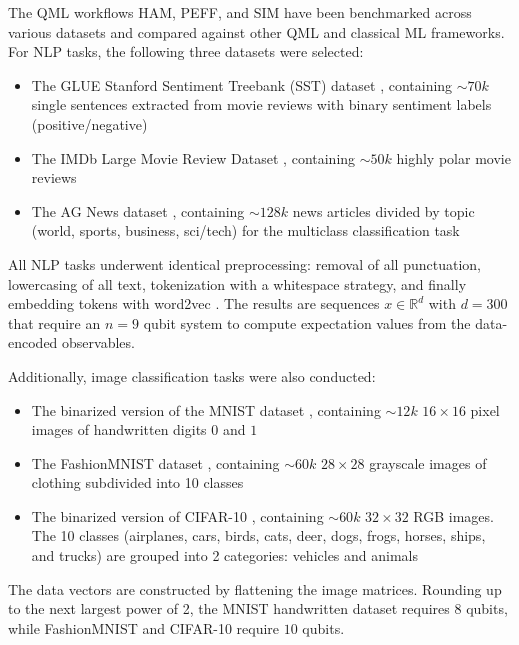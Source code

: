 \documentclass[../main.tex]{subfiles}
\begin{document}
The QML workflows HAM, PEFF, and SIM have been benchmarked across various datasets and compared against other QML and classical ML frameworks.
For NLP tasks, the following three datasets were selected:
\begin{itemize}
    \item The GLUE Stanford Sentiment Treebank (SST) dataset \cite{socher2013recursive, wang2019superglue}, containing $\sim 70k$ single sentences extracted from movie reviews with binary sentiment labels (positive/negative)
    \item The IMDb Large Movie Review Dataset \cite{stanford2011imdb}, containing $\sim 50k$ highly polar movie reviews
    \item The AG News dataset \cite{zhang2015agnews}, containing $\sim 128k$ news articles divided by topic (world, sports, business, sci/tech) for the multiclass classification task
    \end{itemize}
    
All NLP tasks underwent identical preprocessing: removal of all punctuation, lowercasing of all text, tokenization with a whitespace strategy, and finally embedding tokens with word2vec \cite{mikolov2013distributed}. The results are sequences $x \in \mathbb{R}^d$ with $d=300$ that require an $n=9$ qubit system to compute expectation values from the data-encoded observables.

Additionally, image classification tasks were also conducted:
\begin{itemize}
    \item The binarized version of the MNIST dataset \cite{mnistdataset}, containing $\sim 12k$ $16 \times 16$ pixel images of handwritten digits $0$ and $1$ 
    \item The FashionMNIST dataset \cite{xiao2017fashion}, containing $\sim 60k$ $28 \times 28$ grayscale images of clothing subdivided into 10 classes
    \item The binarized version of CIFAR-10 \cite{krizhevsky2012imagenet}, containing $\sim 60k$ $32 \times 32$ RGB images. The 10 classes (airplanes, cars, birds, cats, deer, dogs, frogs, horses, ships, and trucks) are grouped into 2 categories: vehicles and animals
    \end{itemize}
The data vectors are constructed by flattening the image matrices. Rounding up to the next largest power of 2, the MNIST handwritten dataset requires $8$ qubits, while FashionMNIST and CIFAR-10 require $10$ qubits.
\end{document}
